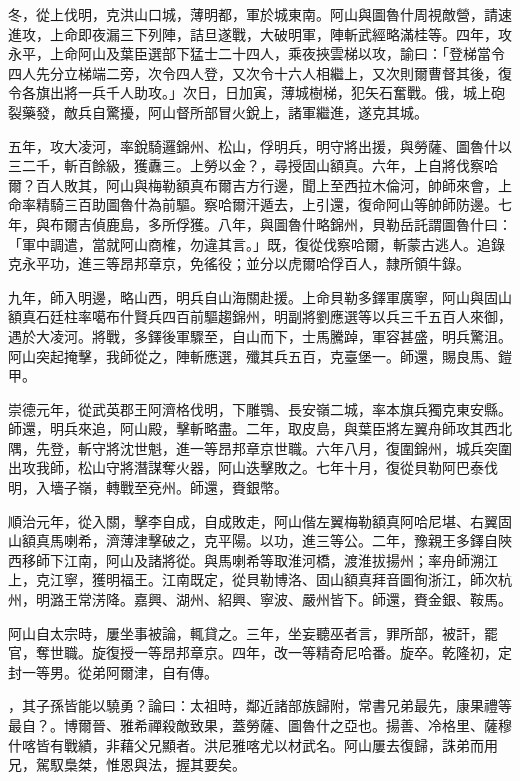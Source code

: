 \begin{pinyinscope}
冬，從上伐明，克洪山口城，薄明都，軍於城東南。阿山與圖魯什周視敵營，請速進攻，上命即夜漏三下列陣，詰旦遂戰，大破明軍，陣斬武經略滿桂等。四年，攻永平，上命阿山及葉臣選部下猛士二十四人，乘夜挾雲梯以攻，諭曰：「登梯當令四人先分立梯端二旁，次令四人登，又次令十六人相繼上，又次則爾曹督其後，復令各旗出將一兵千人助攻。」次日，日加寅，薄城樹梯，犯矢石奮戰。俄，城上砲裂藥發，敵兵自驚擾，阿山督所部冒火銳上，諸軍繼進，遂克其城。

五年，攻大凌河，率銳騎邏錦州、松山，俘明兵，明守將出援，與勞薩、圖魯什以三二千，斬百餘級，獲纛三。上勞以金？，尋授固山額真。六年，上自將伐察哈爾？百人敗其，阿山與梅勒額真布爾吉方行邊，聞上至西拉木倫河，帥師來會，上命率精騎三百助圖魯什為前驅。察哈爾汗遁去，上引還，復命阿山等帥師防邊。七年，與布爾吉偵鹿島，多所俘獲。八年，與圖魯什略錦州，貝勒岳託謂圖魯什曰：「軍中調遣，當就阿山商榷，勿違其言。」既，復從伐察哈爾，斬蒙古逃人。追錄克永平功，進三等昂邦章京，免徭役；並分以虎爾哈俘百人，隸所領牛錄。

九年，師入明邊，略山西，明兵自山海關赴援。上命貝勒多鐸軍廣寧，阿山與固山額真石廷柱率噶布什賢兵四百前驅趨錦州，明副將劉應選等以兵三千五百人來御，遇於大凌河。將戰，多鐸後軍驟至，自山而下，士馬騰踔，軍容甚盛，明兵驚沮。阿山突起掩擊，我師從之，陣斬應選，殲其兵五百，克臺堡一。師還，賜良馬、鎧甲。

崇德元年，從武英郡王阿濟格伐明，下雕鶚、長安嶺二城，率本旗兵獨克東安縣。師還，明兵來追，阿山殿，擊斬略盡。二年，取皮島，與葉臣將左翼舟師攻其西北隅，先登，斬守將沈世魁，進一等昂邦章京世職。六年八月，復圍錦州，城兵突圍出攻我師，松山守將潛謀奪火器，阿山迭擊敗之。七年十月，復從貝勒阿巴泰伐明，入墻子嶺，轉戰至兗州。師還，賚銀幣。

順治元年，從入關，擊李自成，自成敗走，阿山偕左翼梅勒額真阿哈尼堪、右翼固山額真馬喇希，濟薄津擊破之，克平陽。以功，進三等公。二年，豫親王多鐸自陜西移師下江南，阿山及諸將從。與馬喇希等取淮河橋，渡淮拔揚州；率舟師溯江上，克江寧，獲明福王。江南既定，從貝勒博洛、固山額真拜音圖徇浙江，師次杭州，明潞王常淓降。嘉興、湖州、紹興、寧波、嚴州皆下。師還，賚金銀、鞍馬。

阿山自太宗時，屢坐事被論，輒貸之。三年，坐妄聽巫者言，罪所部，被訐，罷官，奪世職。旋復授一等昂邦章京。四年，改一等精奇尼哈番。旋卒。乾隆初，定封一等男。從弟阿爾津，自有傳。

，其子孫皆能以驍勇？論曰：太祖時，鄰近諸部族歸附，常書兄弟最先，康果禮等最自？。博爾晉、雅希禪殺敵致果，蓋勞薩、圖魯什之亞也。揚善、冷格里、薩穆什喀皆有戰績，非藉父兄顯者。洪尼雅喀尤以材武名。阿山屢去復歸，誅弟而用兄，駕馭梟桀，惟恩與法，握其要矣。


\end{pinyinscope}